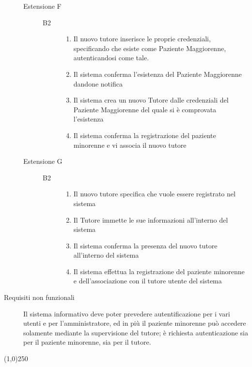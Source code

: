 \begin{description}
\begin{description}
	\item[Estensione F]
	\medskip
	
	\begin{description}
	\item[B2] 
	\medskip
	
	\begin{enumerate}
	\item Il nuovo tutore inserisce le proprie credenziali, specificando che esiste
		come Paziente Maggiorenne, autenticandosi come tale.
	\item Il sistema conferma l'esistenza del Paziente Maggiorenne dandone
		notifica
	\item Il sistema crea un nuovo Tutore dalle credenziali del Paziente
		Maggiorenne del quale si è comprovata l'esistenza
	\item Il sistema conferma la registrazione del paziente minorenne
		e vi associa il nuovo tutore
	\end{enumerate}
	\end{description}

\end{description}

\begin{description}
	\item[Estensione G]
	\medskip
	
	\begin{description}
	\item[B2] 
	\medskip
	
	\begin{enumerate}
	\item Il nuovo tutore specifica che vuole essere registrato nel sistema
	\item Il Tutore immette le sue informazioni all'interno del sistema
	\item Il sistema conferma la presenza del nuovo tutore all'interno del sistema 
	\item Il sistema effettua la registrazione del paziente minorenne e 
		dell'associazione con il tutore utente del sistema
	\end{enumerate}
	\end{description}

\end{description}
\item[Requisiti non funzionali]
\begin{itemize}
\diam Il sistema informativo deve poter prevedere autentificazione per i vari
	utenti e per l'amministratore, ed in più il paziente minorenne può accedere solamente mediante
	la supervisione del tutore; è richiesta autenticazione  sia per il
	paziente minorenne, sia per il tutore.
\end{itemize}
\end{description}
\begin{center}
\line(1,0){250}
\end{center}

